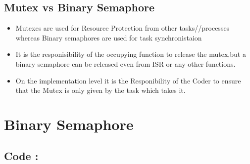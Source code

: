 \documentclass[11pt,a4paper]{article}
\begin{document}
	\subsection{Mutex vs Binary Semaphore}
	\begin{itemize}
		\item Mutexes are used for Resource Protection from other tasks//processes whereas Binary semaphores are used for task synchronistaion
		\\
		\item It is the responisibility of the occupying function to release the mutex,but a binary semaphore can be released even from ISR or any other functions.
		\\
		\item On the implementation level it is the Responibility of the Coder to ensure that the Mutex is only given by the task which takes it.
		
	\end{itemize}
		
	
	
	
	\newpage	
	\section{Binary Semaphore}
	
\subsection{Code : }
		
	\newpage
\end{document}
